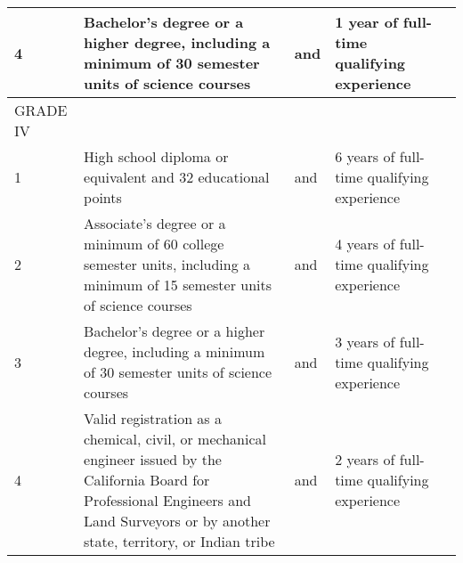 \documentclass[10pt]{article}
\begin{document}
\begin{table}[]
\begin{tabular}{|l|l|l|l|l|}
4         & Bachelor’s   degree   or     a   higher   degree, including a minimum of 30 semester   units of science courses                                                                                                                                                                               & and & 1     year     of       full-time     qualifying   experience                                   &  \\ \hline
GRADE IV  &                                                                                                                                                                                                                                                                                               &     &                                                                                                 &  \\ \hline
1         & High  school  diploma    or  equivalent  and    32 educational points                                                                                                                                                                                                                         & and & 6    years    of      full-time    qualifying   experience                                      &  \\ \hline
2         & Associate’s   degree   or     a  minimum   of     60 college semester units, including a minimum of 15 semester units of   science courses                                                                                                                                                    & and & 4    years    of      full-time    qualifying   experience                                      &  \\ \hline
3         & Bachelor’s   degree   or     a   higher   degree, including a minimum of 30 semester   units of science courses                                                                                                                                                                               & and & 3    years    of      full-time    qualifying   experience                                      &  \\ \hline
4         & Valid  registration  as    a  chemical,  civil,    or mechanical     engineer     issued     by       the California  Board  for    Professional  Engineers and  Land    Surveyors  or  by    another  state, territory, or   Indian tribe                                                    & and & 2    years    of      full-time    qualifying   experience                                      &  \\ \hline

\end{tabular}
\end{table}
\end{document}
